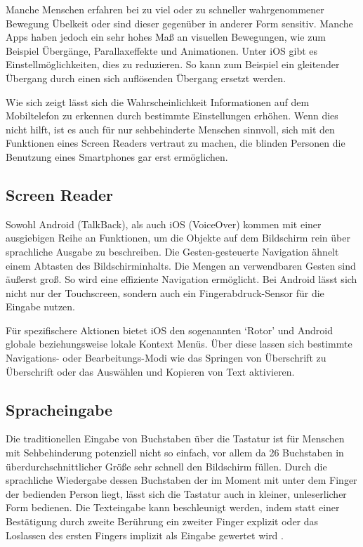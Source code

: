 Manche Menschen erfahren bei zu viel oder zu schneller wahrgenommener Bewegung Übelkeit oder sind dieser gegenüber in anderer Form sensitiv. Manche Apps haben jedoch ein sehr hohes Maß an visuellen Bewegungen, wie zum Beispiel Übergänge, Parallaxeffekte und Animationen. Unter iOS gibt es Einstellmöglichkeiten, dies zu reduzieren. So kann zum Beispiel ein gleitender Übergang durch einen sich auflösenden Übergang ersetzt werden. \cite{ios-reduce-motion}

Wie sich zeigt lässt sich die Wahrscheinlichkeit Informationen auf dem Mobiltelefon zu erkennen durch bestimmte Einstellungen erhöhen. Wenn dies nicht hilft, ist es auch für nur sehbehinderte Menschen sinnvoll, sich mit den Funktionen eines Screen Readers vertraut zu machen, die blinden Personen die Benutzung eines Smartphones gar erst ermöglichen.


\subsection{Screen Reader}

Sowohl Android (TalkBack), als auch iOS (VoiceOver) kommen mit einer ausgiebigen Reihe an Funktionen, um die Objekte auf dem Bildschirm rein über sprachliche Ausgabe zu beschreiben. Die Gesten-gesteuerte Navigation ähnelt einem Abtasten des Bildschirminhalts. Die Mengen an verwendbaren Gesten sind äußerst groß. So wird eine effiziente Navigation ermöglicht. Bei Android lässt sich nicht nur der Touchscreen, sondern auch ein Fingerabdruck-Sensor für die Eingabe nutzen.

Für spezifischere Aktionen bietet iOS den sogenannten `Rotor' und Android globale beziehungsweise lokale Kontext Menüs. Über diese lassen sich bestimmte Navigations- oder Bearbeitungs-Modi wie das Springen von Überschrift zu Überschrift oder das Auswählen und Kopieren von Text aktivieren. \cite{iOS, Android}

\subsection{Spracheingabe}

Die traditionellen Eingabe von Buchstaben über die Tastatur ist für Menschen mit Sehbehinderung potenziell nicht so einfach, vor allem da 26 Buchstaben in überdurchschnittlicher Größe sehr schnell den Bildschirm füllen. Durch die sprachliche Wiedergabe dessen Buchstaben der im Moment mit unter dem Finger der bedienden Person liegt, lässt sich die Tastatur auch in kleiner, unleserlicher Form bedienen. Die Texteingabe kann beschleunigt
werden, indem statt einer Bestätigung durch zweite Berührung ein zweiter Finger explizit oder das Loslassen des ersten Fingers implizit als Eingabe gewertet wird \cite{iOS, Android}.

